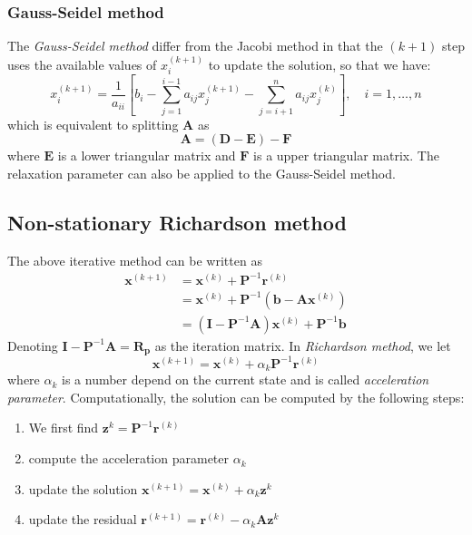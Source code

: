 \documentclass{article}
\begin{document}
\subsubsection{Gauss-Seidel method}
The \emph{Gauss-Seidel method} differ from the Jacobi method in that the $(k+1)$
step uses the available values of $x_i^{(k+1)}$ to update the solution, so that 
we have:
\begin{equation}
    x_i^{(k+1)} = \frac{1}{a_{ii}}\left[
        b_i - \sum_{j=1}^{i-1}a_{ij}x_j^{(k+1)} - \sum_{j = i+1}^n a_{ij}x_j^{(k)}
    \right], \quad i = 1, \dots, n
\end{equation}
which is equivalent to splitting $\mathbf{A}$ as 
\[\mathbf{A} = (\mathbf{D}-\mathbf{E}) - \mathbf{F}\] where $\mathbf{E}$ is a 
lower triangular matrix and $\mathbf{F}$ is a upper triangular matrix. 
The relaxation parameter can also be applied to the Gauss-Seidel method.

\subsection{Non-stationary Richardson method}
The above iterative method can be written as 
\begin{align*}
    \mathbf{x}^{(k+1)} &= \mathbf{x}^{(k)} + \mathbf{P}^{-1}\mathbf{r}^{(k)} \\
    &= \mathbf{x}^{(k)} + \mathbf{P}^{-1} \left(\mathbf{b} - \mathbf{A}\mathbf{x}^{(k)} \right) \\
    &= \left( \mathbf{I} - \mathbf{P}^{-1}\mathbf{A}  \right) \mathbf{x}^{(k)} + \mathbf{P}^{-1} \mathbf{b} 
\end{align*}
Denoting $\mathbf{I} - \mathbf{P}^{-1}\mathbf{A} = \mathbf{R_p}$ as the 
iteration matrix. 
In \emph{Richardson method}, we let
\begin{equation}
    \mathbf{x}^{(k+1)} = \mathbf{x}^{(k)} + \alpha_k \mathbf{P}^{-1}\mathbf{r}^{(k)}
\end{equation}
where $\alpha_k$ is a number depend on the current state and is 
called \emph{acceleration parameter}. Computationally, the solution can be computed 
by the following steps:
\begin{enumerate}
    \item We first find $\mathbf{z}^{k} = \mathbf{P}^{-1}\mathbf{r}^{(k)}$
    \item compute the acceleration parameter $\alpha_k$
    \item update the solution $\mathbf{x}^{(k+1)} = \mathbf{x}^{(k)} + \alpha_k \mathbf{z}^{k}$
    \item update the residual $\mathbf{r}^{(k+1)} = \mathbf{r}^{(k)} - \alpha_k \mathbf{A} \mathbf{z}^{k}$ 
\end{enumerate}
\end{document}
